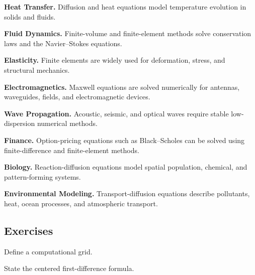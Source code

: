 \begin{applicationbox}

\textbf{Heat Transfer.}
Diffusion and heat equations model temperature evolution in solids and
fluids.

\medskip

\textbf{Fluid Dynamics.}
Finite-volume and finite-element methods solve conservation laws and the
Navier--Stokes equations.

\medskip

\textbf{Elasticity.}
Finite elements are widely used for deformation, stress, and structural
mechanics.

\medskip

\textbf{Electromagnetics.}
Maxwell equations are solved numerically for antennas, waveguides, fields,
and electromagnetic devices.

\medskip

\textbf{Wave Propagation.}
Acoustic, seismic, and optical waves require stable low-dispersion
numerical methods.

\medskip

\textbf{Finance.}
Option-pricing equations such as Black--Scholes can be solved using
finite-difference and finite-element methods.

\medskip

\textbf{Biology.}
Reaction-diffusion equations model spatial population, chemical, and
pattern-forming systems.

\medskip

\textbf{Environmental Modeling.}
Transport-diffusion equations describe pollutants, heat, ocean processes,
and atmospheric transport.

\end{applicationbox}

\subsection{Exercises}
\label{subsec:numerical-pde-exercises}

\begin{exercise}[1]
Define a computational grid.
\end{exercise}

\begin{exercise}[1]
State the centered first-difference formula.
\end{exercise}

